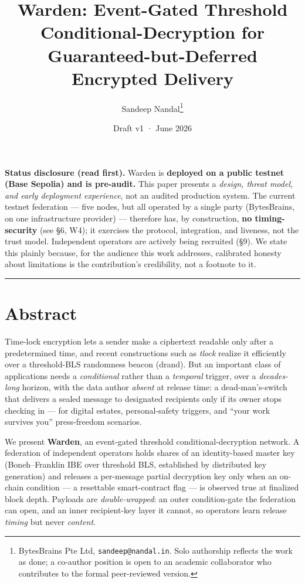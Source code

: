 \documentclass[
  11pt,
]{article}
\title{Warden: Event-Gated Threshold Conditional-Decryption for
Guaranteed-but-Deferred Encrypted Delivery}
\author{Sandeep
Nandal\thanks{BytesBrains Pte Ltd, \texttt{sandeep@nandal.in}. Solo authorship reflects the work as done; a co-author position is open to an academic collaborator who contributes to the formal peer-reviewed version.}}
\date{Draft v1 · June 2026}
\begin{document}
\maketitle

\textbf{Status disclosure (read first).} Warden is \textbf{deployed on a
public testnet (Base Sepolia) and is pre-audit.} This paper presents a
\emph{design, threat model, and early deployment experience}, not an
audited production system. The current testnet federation --- five
nodes, but all operated by a single party (BytesBrains, on one
infrastructure provider) --- therefore has, by construction, \textbf{no
timing-security} (see §6, W4); it exercises the protocol, integration,
and liveness, not the trust model. Independent operators are actively
being recruited (§9). We state this plainly because, for the audience
this work addresses, calibrated honesty about limitations is the
contribution's credibility, not a footnote to it.

\begin{center}\rule{0.5\linewidth}{0.5pt}\end{center}

\section{Abstract}\label{abstract}

Time-lock encryption lets a sender make a ciphertext readable only after
a predetermined time, and recent constructions such as \emph{tlock}
realize it efficiently over a threshold-BLS randomness beacon (drand).
But an important class of applications needs a \emph{conditional} rather
than a \emph{temporal} trigger, over a \emph{decades-long} horizon, with
the data author \emph{absent} at release time: a dead-man's-switch that
delivers a sealed message to designated recipients only if its owner
stops checking in --- for digital estates, personal-safety triggers, and
``your work survives you'' press-freedom scenarios.

We present \textbf{Warden}, an event-gated threshold
conditional-decryption network. A federation of independent operators
holds shares of an identity-based master key (Boneh--Franklin IBE over
threshold BLS, established by distributed key generation) and releases a
per-message partial decryption key only when an on-chain condition --- a
resettable smart-contract flag --- is observed true at finalized block
depth. Payloads are \emph{double-wrapped}: an outer condition-gate the
federation can open, and an inner recipient-key layer it cannot, so
operators learn release \emph{timing} but never \emph{content}.
\end{document}

